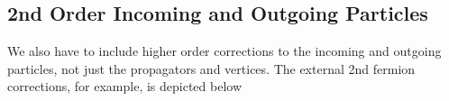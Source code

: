 \subsection{2nd Order Incoming and Outgoing Particles}
We also have to include higher order corrections to the incoming and outgoing particles, not just the propagators and vertices. The external 2nd fermion corrections, for example, is depicted below
\begin{figure}[H]
    \centering


\begin{tikzpicture}[x=0.75pt,y=0.75pt,yscale=-1,xscale=1]


\end{tikzpicture}
\end{figure}
